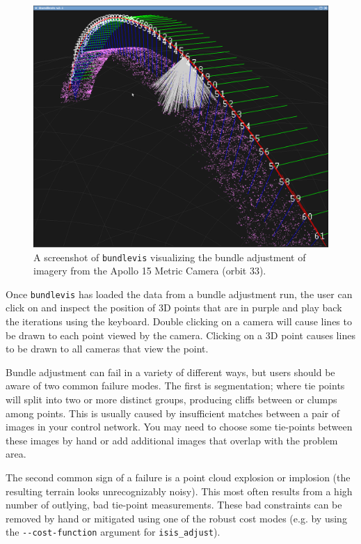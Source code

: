 \begin{figure}[b!]
  \begin{center}
  \includegraphics[width=5in]{images/bundlevis_apollo.png}
  \end{center}
  \caption{ A screenshot of \texttt{bundlevis} visualizing the bundle
    adjustment of imagery from the Apollo 15 Metric Camera (orbit
    33). }
  \label{fig:bundlevis}
\end{figure}

Once \texttt{bundlevis} has loaded the data from a bundle adjustment run,
the user can click on and inspect the position of 3D points that are
in purple and play back the iterations using the keyboard. Double
clicking on a camera will cause lines to be drawn to each point viewed
by the camera. Clicking on a 3D point causes lines to be drawn to all
cameras that view the point.

Bundle adjustment can fail in a variety of different ways, but users
should be aware of two common failure modes.  The first is segmentation;
where tie points will split into two or more distinct groups,
producing cliffs between or clumps among points. This is usually
caused by insufficient matches between a pair of images in your
control network.  You may need to choose some tie-points between
these images by hand or add additional images that overlap with the
problem area.

The second common sign of a failure is a point cloud explosion or
implosion (the resulting terrain looks unrecognizably noisy). This
most often results from a high number of outlying, bad tie-point
measurements. These bad constraints can be removed by hand or
mitigated using one of the robust cost modes (e.g. by using the
\texttt{-\/-cost-function} argument for \texttt{isis\_adjust}).

